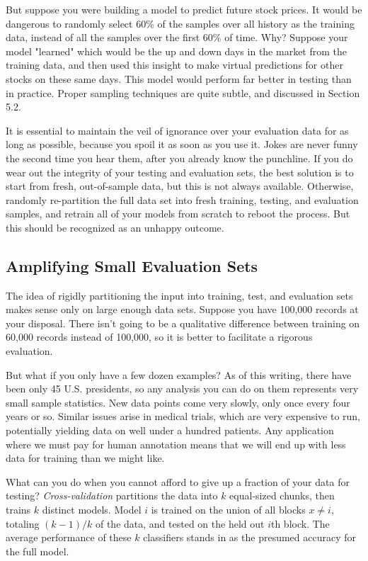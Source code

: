 \documentclass[10pt]{article}
\begin{document}
But suppose you were building a model to predict future stock prices. It would be dangerous to randomly select 60\% of the samples over all history as the training data, instead of all the samples over the first 60\% of time. Why? Suppose your model "learned" which would be the up and down days in the market from the training data, and then used this insight to make virtual predictions for other stocks on these same days. This model would perform far better in testing than in practice. Proper sampling techniques are quite subtle, and discussed in Section 5.2.

It is essential to maintain the veil of ignorance over your evaluation data for as long as possible, because you spoil it as soon as you use it. Jokes are never funny the second time you hear them, after you already know the punchline. If you do wear out the integrity of your testing and evaluation sets, the best solution is to start from fresh, out-of-sample data, but this is not always available. Otherwise, randomly re-partition the full data set into fresh training, testing, and evaluation samples, and retrain all of your models from scratch to reboot the process. But this should be recognized as an unhappy outcome.

\subsection{Amplifying Small Evaluation Sets}
The idea of rigidly partitioning the input into training, test, and evaluation sets makes sense only on large enough data sets. Suppose you have 100,000 records at your disposal. There isn’t going to be a qualitative difference between training on 60,000 records instead of 100,000, so it is better to facilitate a rigorous evaluation.

But what if you only have a few dozen examples? As of this writing, there have been only 45 U.S. presidents, so any analysis you can do on them represents very small sample statistics. New data points come very slowly, only once every four years or so. Similar issues arise in medical trials, which are very expensive to run, potentially yielding data on well under a hundred patients. Any application where we must pay for human annotation means that we will end up with less data for training than we might like.

What can you do when you cannot afford to give up a fraction of your data for testing? \textit{Cross-validation} partitions the data into $k$ equal-sized chunks, then trains $k$ distinct models. Model $i$ is trained on the union of all blocks $x \neq i$, totaling $(k-1)/k$ of the data, and tested on the held out $i$th block. The average performance of these $k$ classifiers stands in as the presumed accuracy for the full model.
\end{document}
